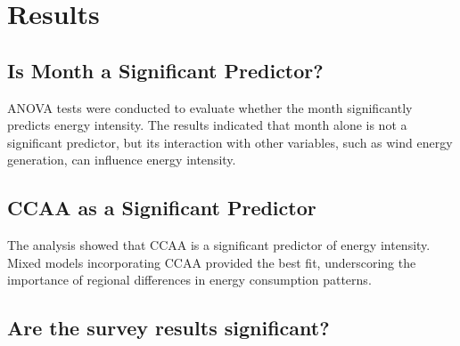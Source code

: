 \documentclass[
]{report}
\begin{document}
\hypertarget{results}{%
\chapter{Results}\label{results}}

\hypertarget{is-month-a-significant-predictor}{%
\section{Is Month a Significant
Predictor?}\label{is-month-a-significant-predictor}}

ANOVA tests were conducted to evaluate whether the month significantly
predicts energy intensity. The results indicated that month alone is not
a significant predictor, but its interaction with other variables, such
as wind energy generation, can influence energy intensity.

\hypertarget{ccaa-as-a-significant-predictor}{%
\section{CCAA as a Significant
Predictor}\label{ccaa-as-a-significant-predictor}}

The analysis showed that CCAA is a significant predictor of energy
intensity. Mixed models incorporating CCAA provided the best fit,
underscoring the importance of regional differences in energy
consumption patterns.

\hypertarget{are-the-survey-results-significant}{%
\section{Are the survey results
significant?}\label{are-the-survey-results-significant}}
\end{document}
